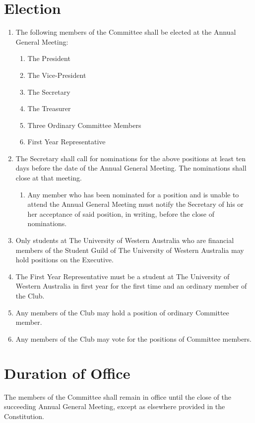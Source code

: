 \documentclass[11pt]{article} %
\begin{document}
\section{Election}
\begin{enumerate}
	\item The following members of the Committee shall be elected at the Annual General Meeting:
		\begin{enumerate}
			\item The President
			\item The Vice-President
			\item The Secretary
			\item The Treasurer
			\item Three Ordinary Committee Members
			\item First Year Representative
		\end{enumerate}
	\item The Secretary shall call for nominations for the above positions at least ten days before the date of the Annual General Meeting. The nominations shall close at that meeting.
		\begin{enumerate}
			\item Any member who has been nominated for a position and is unable to attend the Annual General Meeting must notify the Secretary of his or her acceptance of said position, in writing, before the close of nominations.
		\end{enumerate}
	\item Only students at The University of Western Australia who are financial members of the Student Guild of The University of Western Australia may hold positions on the Executive.
	\item The First Year Representative must be a student at The University of Western Australia in first year for the first time and an ordinary member of the Club.
	\item Any members of the Club may hold a position of ordinary Committee member.
	\item Any members of the Club may vote for the positions of Committee members.
\end{enumerate}

\section{Duration of Office}
The members of the Committee shall remain in office until the close of the succeeding Annual General Meeting, except as elsewhere provided in the Constitution.
\end{document}
